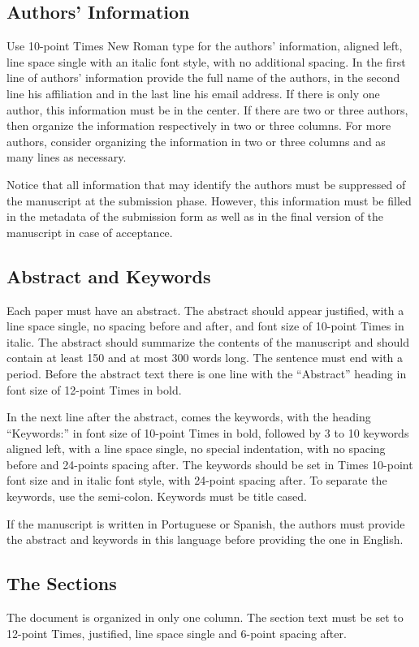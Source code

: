 \documentclass[english, spanish, brazilian]{RBIEarticle} %
\begin{document}
\subsection{Authors’ Information}
Use 10-point Times New Roman type for the authors’ information, aligned left, line space single with an italic font style, with no additional spacing. In the first line of authors’ information provide the full name of the authors, in the second line his affiliation and in the last line his email address. If there is only one author, this information must be in the center. If there are two or three authors, then organize the information respectively in two or three columns. For more authors, consider organizing the information in two or three columns and as many lines as necessary.

Notice that all information that may identify the authors must be suppressed of the manuscript at the submission phase. However, this information must be filled in the metadata of the submission form as well as in the final version of the manuscript in case of acceptance.


\subsection{Abstract and Keywords}
Each paper must have an abstract. The abstract should appear justified, with a line space single, no spacing before and after, and font size of 10-point Times in italic. The abstract should summarize the contents of the manuscript and should contain at least 150 and at most 300 words long. The sentence must end with a period. Before the abstract text there is one line with the ``Abstract'' heading in font size of 12-point Times in bold.

In the next line after the abstract, comes the keywords, with the heading ``Keywords:'' in font size of 10-point Times in bold, followed by 3 to 10 keywords aligned left, with a line space single, no special indentation, with no spacing before and 24-points spacing after. The keywords should be set in Times 10-point font size and in italic font style, with 24-point spacing after. To separate the keywords, use the semi-colon. Keywords must be title cased.

If the manuscript is written in Portuguese or Spanish, the authors must provide the abstract and keywords in this language before providing the one in English.


\subsection{The Sections}
The document is organized in only one column. The section text must be set to 12-point Times, justified, line space single and 6-point spacing after.
\end{document}

